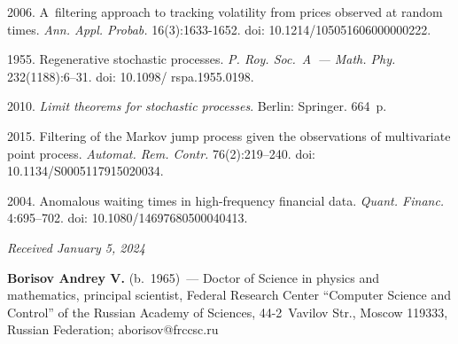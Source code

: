 \begin{multicols}{2}
{{\begin{thebibliography}{99}
 2006. 
A~filtering approach to tracking volatility from prices observed at random times. \textit{Ann. Appl. Probab.} 16(3):1633-1652. doi: 10.1214/105051606000000222.

 1955. 
Regenerative stochastic processes. \textit{P. Roy. Soc.~A~--- Math. Phy.} 232(1188):6--31. 
doi: 10.1098/ rspa.1955.0198.

 
 2010. \textit{Limit theorems for stochastic processes}. Berlin: Springer. 664~p.

 
 2015. Filtering of the Markov jump process given the observations of multivariate point process.
\textit{Automat. Rem. Contr.} 76(2):219--240.
doi: 10.1134/S0005117915020034.

 2004. 
Anomalous waiting times in high-frequency financial data.  
\textit{Quant. Financ.} 4:695--702.
doi: 10.1080/14697680500040413.
\end{thebibliography}

 }
 }

\end{multicols}

\vspace*{-6pt}

\hfill{\small\textit{Received January 5, 2024}} 



\Contrl

\vspace*{-3pt}

\noindent
\textbf{Borisov Andrey V.} (b.\ 1965)~--- 
Doctor of Science in physics and mathematics, principal scientist, Federal Research Center ``Computer Science and Control'' 
of the Russian Academy of Sciences, 44-2~Vavilov Str., Moscow 119333, Russian Federation; \mbox{aborisov@frccsc.ru}



\label{end\stat}

\renewcommand{\bibname}{\protect\rm Литература} 